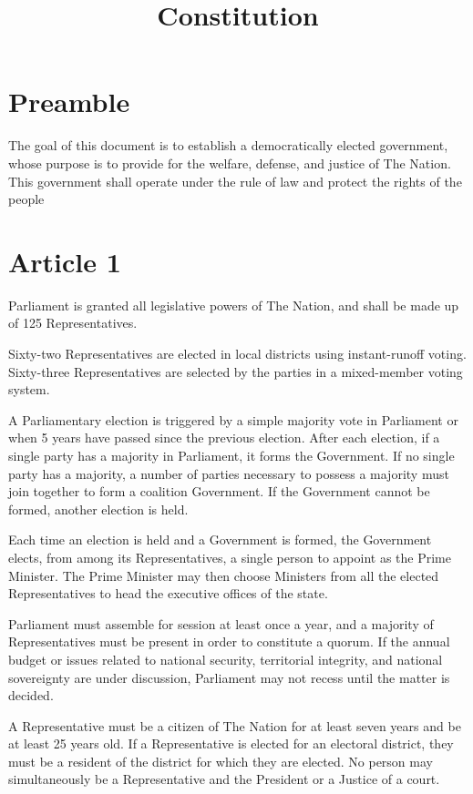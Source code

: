 \documentclass{report}
\title{Constitution}
\newcommand{\nation}{The Nation}
\begin{document}
    \maketitle
    \section{Preamble}
    The goal of this document is to establish a democratically elected government,
    whose purpose is to provide for the welfare, defense, and justice of \nation.
    This government shall operate under the rule of law and protect the rights of
    the people

    \section{Article 1}

    Parliament is granted all legislative powers of \nation, and shall be made
    up of 125 Representatives.

    Sixty-two Representatives are elected in local districts using instant-runoff
    voting. Sixty-three Representatives are selected by the parties in a
    mixed-member voting system.

    A Parliamentary election is triggered by a simple majority vote in Parliament
    or when 5 years have passed since the previous election. After each election,
    if a single party has a majority in Parliament, it forms the Government. If
    no single party has a majority, a number of parties necessary to possess a
    majority must join together to form a coalition Government. If the Government
    cannot be formed, another election is held.

    Each time an election is held and a Government is formed, the Government
    elects, from among its Representatives, a single person to appoint as the
    Prime Minister. The Prime Minister may then choose Ministers from all the
    elected Representatives to head the executive offices of the state.

    Parliament must assemble for session at least once a year, and a majority of
    Representatives must be present in order to constitute a quorum. If the
    annual budget or issues related to national security, territorial integrity,
    and national sovereignty are under discussion, Parliament may not recess
    until the matter is decided.

    A Representative must be a citizen of \nation{} for at least seven years and
    be at least 25 years old. If a Representative is elected for an electoral
    district, they must be a resident of the district for which they are
    elected. No person may simultaneously be a Representative and the President
    or a Justice of a court.
\end{document}
